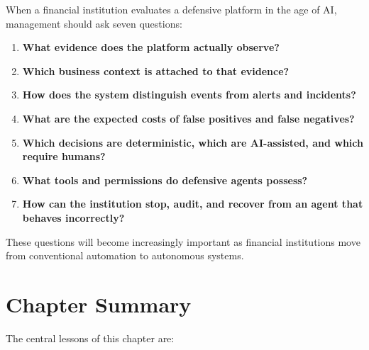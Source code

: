 When a financial institution evaluates a defensive platform in the age of AI, management should ask seven questions:

\begin{enumerate}
    \item \textbf{What evidence does the platform actually observe?}
    \item \textbf{Which business context is attached to that evidence?}
    \item \textbf{How does the system distinguish events from alerts and incidents?}
    \item \textbf{What are the expected costs of false positives and false negatives?}
    \item \textbf{Which decisions are deterministic, which are AI-assisted, and which require humans?}
    \item \textbf{What tools and permissions do defensive agents possess?}
    \item \textbf{How can the institution stop, audit, and recover from an agent that behaves incorrectly?}
\end{enumerate}

These questions will become increasingly important as financial institutions move from conventional automation to autonomous systems.

\section{Chapter Summary}

The central lessons of this chapter are:


